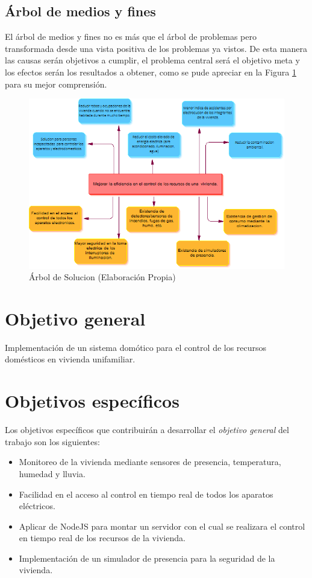 \documentclass[11pt,letterpaper]{report}
\begin{document}
		\subsection{Árbol de medios y  fines}
			El árbol de medios y fines no es más  que el árbol de problemas pero transformada desde una vista positiva de los problemas ya vistos.  De  esta manera las  causas serán objetivos a cumplir, el problema central será el objetivo meta y los efectos serán los resultados a obtener, como se pude apreciar en la Figura \ref{arbolSolucion} para su mejor comprensión.
 		\begin{figure}[ht]
			\centering
			\includegraphics[width=0.9\linewidth]{imagenes/aMF.png}
			\caption{Árbol de Solucion (Elaboración Propia)}
			\label{arbolSolucion} 
		\end{figure}
	\section{Objetivo general}
	Implementación de un sistema domótico para el control de los recursos domésticos en vivienda unifamiliar.

	\section{Objetivos específicos}

	Los objetivos específicos que contribuirán a desarrollar el \textit{objetivo general} del trabajo son los siguientes:

	\begin{itemize}
		\item Monitoreo de la vivienda mediante sensores de presencia, temperatura, humedad y lluvia.
		\item Facilidad en el acceso al control en tiempo real de todos los aparatos eléctricos.
		\item Aplicar de NodeJS para montar un servidor con el cual se realizara el control en tiempo real de los recursos de la vivienda.
		\item Implementación de un simulador de presencia para la seguridad de la vivienda.
	\end{itemize}
\end{document}
